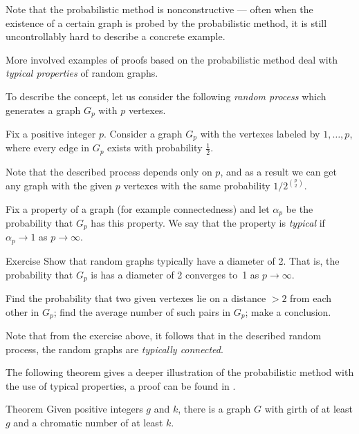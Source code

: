 Note that the probabilistic method is nonconstructive ---
often when the existence of a certain graph is probed by the probabilistic method,
it is still uncontrollably hard to describe a concrete example.

More involved examples of proofs based on the probabilistic method deal with {}\emph{typical properties} of random graphs.

To describe the concept, let us consider the following {}\emph{random process} which generates a graph $G_p$ with $p$ vertexes.

Fix a positive integer $p$. 
Consider a graph $G_p$ with the vertexes labeled by $1,\dots,p$,
where every edge in $G_p$ exists with probability $\tfrac12$.

Note that the described process depends only on $p$, and as a result we can get any graph with the given $p$ vertexes with the same probability $1/2^{\binom{p}{2}}$.

Fix a property of a graph (for example connectedness)
and let $\alpha_p$ be the probability that $G_p$ has this property.
We say that the property is \emph{typical} if $\alpha_p\to 1$ as $p\to \infty$.

\begin{thm}{Exercise}
Show that random graphs typically have a diameter of 2.
That is, the probability that $G_p$ is has a diameter of 2 converges to~1 as $p\to \infty$.
\end{thm}

 Find the probability that two given vertexes lie on a distance $>2$ from each other in $G_p$; find the average number of such pairs in $G_p$; make a conclusion.

\medskip

Note that from the exercise above, it follows that in the described random process, the random graphs are {}\emph{typically connected}.

The following theorem gives a deeper illustration of the probabilistic method with the use of typical properties,
a proof can be found in \cite[Chapter 44]{aigner-ziegler}.

\begin{thm}{Theorem}
Given positive integers $g$ and $k$, there is a graph $G$ with girth of at least $g$ and a chromatic number of at least $k$. %
\end{thm}
